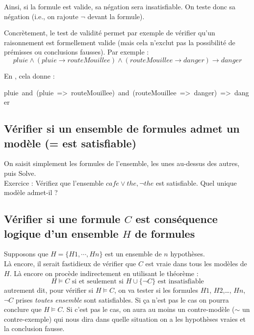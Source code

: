 \noindent
Ainsi, si la formule est valide, sa négation sera insatisfiable. On teste donc sa négation (i.e., on rajoute $\neg$ devant la formule).

Concrètement, le test de validité permet par exemple de vérifier qu'un raisonnement est formellement valide (mais cela n'exclut pas la possibilité de prémisses ou conclusions fausses). Par exemple :
\[pluie \wedge (pluie \rightarrow routeMouillee) \wedge (routeMouillee\rightarrow danger) \rightarrow danger\]

En \touist, cela donne :
\begin{mdpre}%
\noindent pluie~and~(pluie~=\textgreater{}~routeMouillee)~and~(routeMouillee~=\textgreater{}~danger)~=\textgreater{}~danger%
\end{mdpre}%







\subsection{Vérifier si un ensemble de formules admet un modèle (= est satisfiable)}
On saisit simplement les formules de l'ensemble, les unes au-dessus des autres, puis Solve. \\
Exercice : Vérifiez que l'ensemble $\mathit{cafe\vee the, \neg the}$ est satisfiable. Quel unique modèle admet-il ? 
\subsection{Vérifier si une formule $C$ est conséquence logique d'un ensemble $H$ de formules}
Supposons que $H=\{H1,\cdots,Hn\}$ est un ensemble de $n$ hypothèses.\\
Là encore, il serait fastidieux de vérifier que $C$ est vraie dans tous les modèles de $H$. Là encore on procède indirectement en utilisant le théorème : 
\[H\models C \mbox{ si et seulement si } H\cup\{\neg C\}\mbox{ est insatisfiable}\]
autrement dit, pour vérifier si $H\models C$, on va tester si les formules $H1$, $H2$,\ldots, $Hn$, $\neg C$ prises \emph{toutes ensemble} sont satisfiables. Si ça n'est pas le cas on pourra conclure que $H\models C$. Si c'est pas le cas, on aura au moins un contre-modèle ($\sim$ un contre-exemple) qui nous dira dans quelle situation on a les hypothèses vraies et la conclusion fausse.

